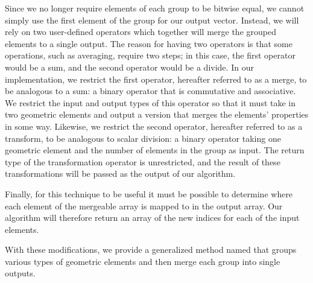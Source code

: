 \documentclass[10pt,journal,cspaper,compsoc]{IEEEtran}
\begin{document}
Since we no longer require elements of each group to be bitwise
equal, we cannot simply use the first element of the group for our output vector. Instead, we will rely on two user-defined operators
which together will merge the grouped elements to a single output. The reason for having two operators is that some operations, such
as averaging, require two steps; in this case, the first operator would be a sum, and the second operator would be a divide. In our
implementation, we restrict the first operator, hereafter referred to as a merge, to be analogous to a sum: a binary operator that is commutative and associative. We restrict the input and output types of this operator so that it must take in two geometric elements and output a version that merges the elements' properties in some way.
Likewise, we restrict the second operator, hereafter referred to as a transform, to be analogous to scalar division: a binary operator taking one geometric element and the number of elements in the
group as input. The return type of the transformation operator is unrestricted, and the result of these transformations will be passed as the output of our algorithm. 

Finally, for this technique to be useful it must be possible to determine where each element of the mergeable array is mapped to in the output array. 
Our algorithm will therefore return an array of the new indices for each of the input elements.


With these modifications, we provide a generalized method named  that groups various 
types of geometric elements and then merge each group into single outputs.
\end{document}
